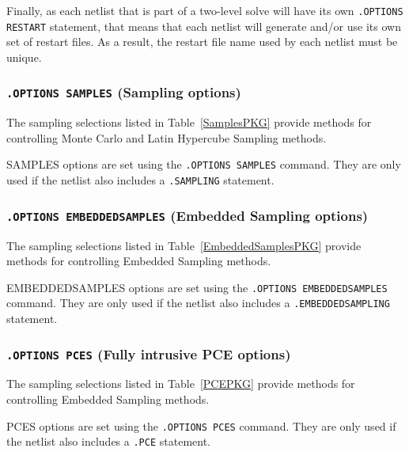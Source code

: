{{\begin{XyceItemize}
\item Finally, as each netlist that is part of a two-level solve will have its
own \texttt{.OPTIONS RESTART} statement, that means that each netlist
will generate and/or use its own set of restart files.  As a result,
the restart file name used by each netlist must be unique.
\end{XyceItemize}

\subsubsection{\texttt{.OPTIONS SAMPLES} (Sampling options)}

The sampling selections listed in Table~\ref{SamplesPKG}
provide methods for controlling Monte Carlo and Latin Hypercube Sampling methods.

SAMPLES options are set using the \texttt{.OPTIONS SAMPLES} command. 
They are only used if the netlist also includes a \texttt{.SAMPLING} statement. 



\subsubsection{\texttt{.OPTIONS EMBEDDEDSAMPLES} (Embedded Sampling options)}

The sampling selections listed in Table~\ref{EmbeddedSamplesPKG}
provide methods for controlling Embedded Sampling methods.

EMBEDDEDSAMPLES options are set using the \texttt{.OPTIONS EMBEDDEDSAMPLES}
command.  They are only used if the
netlist also includes a \texttt{.EMBEDDEDSAMPLING} statement.



\subsubsection{\texttt{.OPTIONS PCES} (Fully intrusive PCE options)}

The sampling selections listed in Table~\ref{PCEPKG}
provide methods for controlling Embedded Sampling methods.

PCES options are set using the \texttt{.OPTIONS PCES}
command.  They are only used if the
netlist also includes a \texttt{.PCE} statement.

}}

